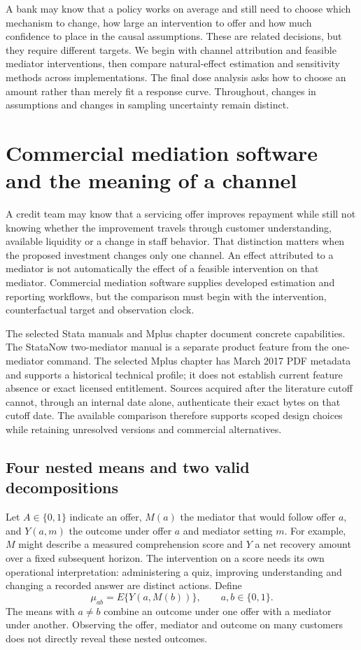 A bank may know that a policy works on average and still need to choose
which mechanism to change, how large an intervention to offer and how much
confidence to place in the causal assumptions. These are related decisions,
but they require different targets. We begin with channel attribution and
feasible mediator interventions, then compare natural-effect estimation and
sensitivity methods across implementations. The final dose analysis asks how
to choose an amount rather than merely fit a response curve. Throughout,
changes in assumptions and changes in sampling uncertainty remain distinct.

\section{Commercial mediation software and the meaning of a channel}
\label{exec20:med-scope}
A credit team may know that a servicing offer improves repayment while still not knowing whether the improvement travels through customer understanding, available liquidity or a change in staff behavior. That distinction matters when the proposed investment changes only one channel. An effect attributed to a mediator is not automatically the effect of a feasible intervention on that mediator. Commercial mediation software supplies developed estimation and reporting workflows, but the comparison must begin with the intervention, counterfactual target and observation clock.

The selected Stata manuals and Mplus chapter document concrete capabilities. The StataNow two-mediator manual is a separate product feature from the one-mediator command. The selected Mplus chapter has March 2017 PDF metadata and supports a historical technical profile; it does not establish current feature absence or exact licensed entitlement. Sources acquired after the literature cutoff cannot, through an internal date alone, authenticate their exact bytes on that cutoff date. The available comparison therefore supports scoped design choices while retaining unresolved versions and commercial alternatives.~\citep{exec20_med_stata_one,exec20_med_stata_multiple,exec20_med_mplus_ch17}

\subsection{Four nested means and two valid decompositions}
\label{exec20:med-targets}
Let $A\in\{0,1\}$ indicate an offer, $M(a)$ the mediator that would follow offer $a$, and $Y(a,m)$ the outcome under offer $a$ and mediator setting $m$. For example, $M$ might describe a measured comprehension score and $Y$ a net recovery amount over a fixed subsequent horizon. The intervention on a score needs its own operational interpretation: administering a quiz, improving understanding and changing a recorded answer are distinct actions. Define
\begin{equation}
 \mu_{ab}=E\{Y(a,M(b))\},\qquad a,b\in\{0,1\}.
 \label{exec20:med-means}
\end{equation}
The means with $a\ne b$ combine an outcome under one offer with a mediator under another. Observing the offer, mediator and outcome on many customers does not directly reveal these nested outcomes.

